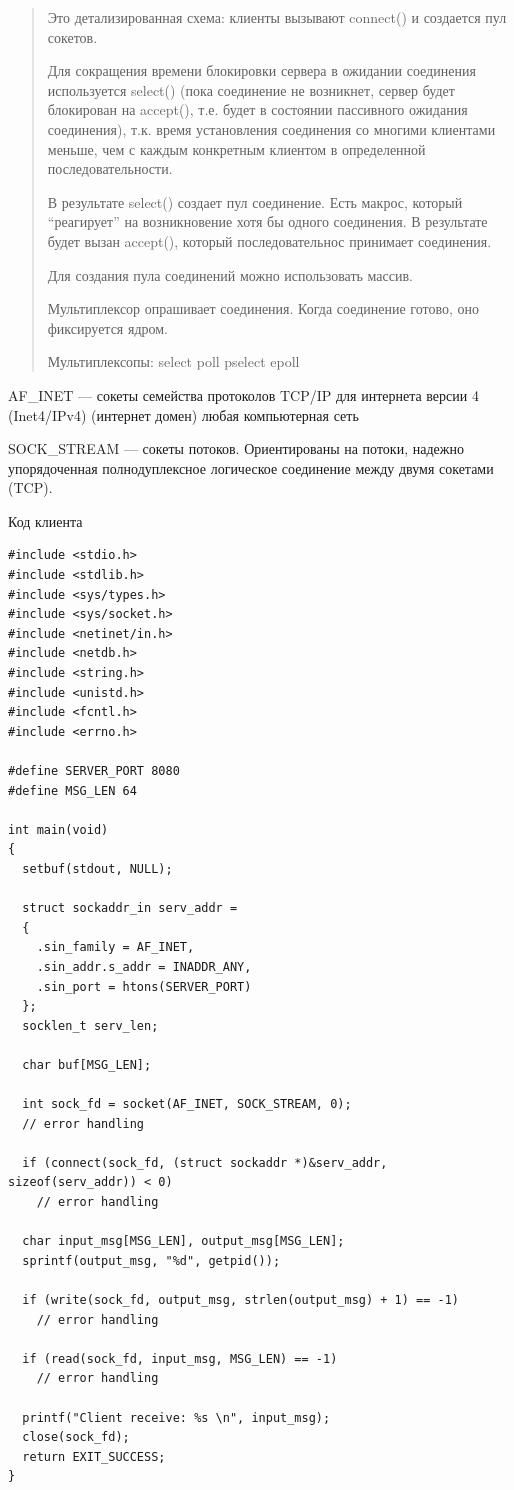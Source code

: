 \begin{quote}
Это детализированная схема: клиенты вызывают connect() и создается пул сокетов.

Для сокращения времени блокировки сервера в ожидании соединения используется select() (пока соединение не возникнет, сервер будет блокирован на accept(), т.е. будет в состоянии пассивного ожидания соединения), т.к. время установления соединения со многими клиентами меньше, чем с каждым конкретным клиентом в определенной последовательности.

В результате select() создает пул соединение. Есть макрос, который “реагирует” на возникновение хотя бы одного соединения. В результате будет вызан accept(), который последовательнос принимает соединения.

Для создания пула соединений можно использовать массив.

Мультиплексор опрашивает соединения. Когда соединение готово, оно фиксируется ядром.

Мультиплексопы: 
select    poll
pselect   epoll
\end{quote}

AF\_INET — сокеты семейства протоколов TCP/IP для интернета версии 4 (Inet4/IPv4) (интернет домен) любая компьютерная сеть

SOCK\_STREAM — сокеты потоков. Ориентированы на потоки, надежно упорядоченная полнодуплексное логическое соединение между двумя сокетами (TCP). 


Код клиента
\begin{lstlisting}
#include <stdio.h>
#include <stdlib.h>
#include <sys/types.h>
#include <sys/socket.h>
#include <netinet/in.h>
#include <netdb.h>
#include <string.h>
#include <unistd.h>
#include <fcntl.h>
#include <errno.h>

#define SERVER_PORT 8080
#define MSG_LEN 64

int main(void)
{
  setbuf(stdout, NULL);

  struct sockaddr_in serv_addr =
  {
    .sin_family = AF_INET,
    .sin_addr.s_addr = INADDR_ANY,
    .sin_port = htons(SERVER_PORT)
  };
  socklen_t serv_len;

  char buf[MSG_LEN];

  int sock_fd = socket(AF_INET, SOCK_STREAM, 0);
  // error handling

  if (connect(sock_fd, (struct sockaddr *)&serv_addr, sizeof(serv_addr)) < 0)
    // error handling

  char input_msg[MSG_LEN], output_msg[MSG_LEN];
  sprintf(output_msg, "%d", getpid());

  if (write(sock_fd, output_msg, strlen(output_msg) + 1) == -1)
    // error handling

  if (read(sock_fd, input_msg, MSG_LEN) == -1)
    // error handling

  printf("Client receive: %s \n", input_msg);
  close(sock_fd);
  return EXIT_SUCCESS;
}
\end{lstlisting}

